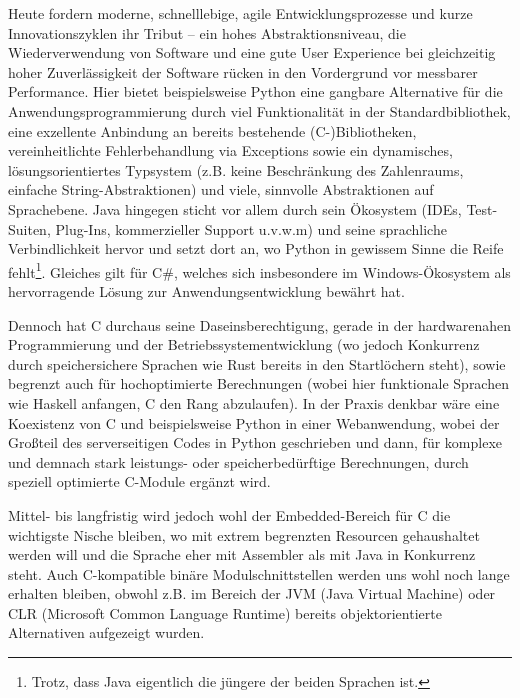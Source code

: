 Heute fordern moderne, schnelllebige, agile Entwicklungsprozesse und kurze Innovationszyklen ihr Tribut -- ein hohes
Abstraktionsniveau, die Wiederverwendung von Software und eine gute User Experience bei gleichzeitig hoher
Zuverlässigkeit der Software rücken in den Vordergrund vor messbarer Performance. Hier bietet beispielsweise Python eine
gangbare Alternative für die Anwendungsprogrammierung durch viel Funktionalität in der Standardbibliothek, eine
exzellente Anbindung an bereits bestehende (C-)Bibliotheken,
vereinheitlichte Fehlerbehandlung via Exceptions sowie ein dynamisches, lösungsorientiertes Typsystem (z.B. keine
Beschränkung des Zahlenraums, einfache String-Abstraktionen) und viele, sinnvolle Abstraktionen auf Sprachebene.
Java hingegen sticht vor allem durch sein Ökosystem (IDEs, Test-Suiten, Plug-Ins, kommerzieller Support u.v.w.m) und
seine sprachliche Verbindlichkeit hervor und setzt dort an, wo Python in gewissem Sinne die Reife fehlt\footnote{Trotz,
dass Java eigentlich die jüngere der beiden Sprachen ist.}. Gleiches gilt für C\#, welches sich insbesondere im
Windows-Ökosystem als hervorragende Lösung zur Anwendungsentwicklung bewährt hat.

Dennoch hat C durchaus seine Daseinsberechtigung, gerade in der hardwarenahen Programmierung und der Betriebssystementwicklung
(wo jedoch Konkurrenz durch speichersichere Sprachen wie Rust bereits in den Startlöchern steht), sowie begrenzt auch
für hochoptimierte Berechnungen (wobei hier funktionale Sprachen wie Haskell anfangen, C den Rang abzulaufen). In der
Praxis denkbar wäre eine Koexistenz von C und beispielsweise Python in einer Webanwendung, wobei der Großteil des
serverseitigen Codes in Python geschrieben und dann, für komplexe und demnach stark leistungs- oder speicherbedürftige
Berechnungen, durch speziell optimierte C-Module ergänzt wird.

Mittel- bis langfristig wird jedoch wohl der Embedded-Bereich für C die wichtigste Nische bleiben, wo mit extrem
begrenzten Resourcen gehaushaltet werden will und die Sprache eher mit Assembler als mit Java in Konkurrenz steht. Auch
C-kompatible binäre Modulschnittstellen werden uns wohl noch lange erhalten bleiben, obwohl z.B. im Bereich der JVM
(Java Virtual Machine) oder CLR (Microsoft Common Language Runtime) bereits objektorientierte Alternativen aufgezeigt
wurden.
